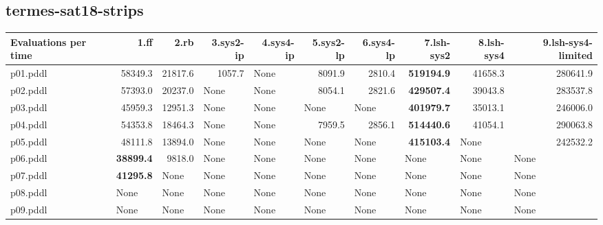 \documentclass{article}
\begin{document}
\hypertarget{evaluations_per_time-termes-sat18-strips}{}
\subsection*{termes-sat18-strips}

\begin{tabular}{@{}lrrrrrrrrr@{}}
Evaluations per time & 1.ff & 2.rb & 3.sys2-ip & 4.sys4-ip & 5.sys2-lp & 6.sys4-lp & 7.lsh-sys2 & 8.lsh-sys4 & 9.lsh-sys4-limited \\
\midrule
p01.pddl & 58349.3 & 21817.6 & 1057.7 & \multicolumn{1}{|l|}{None} & 8091.9 & 2810.4 & \textbf{519194.9} & 41658.3 & 280641.9 \\
p02.pddl & 57393.0 & 20237.0 & \multicolumn{1}{|l|}{None} & \multicolumn{1}{|l|}{None} & 8054.1 & 2821.6 & \textbf{429507.4} & 39043.8 & 283537.8 \\
p03.pddl & 45959.3 & 12951.3 & \multicolumn{1}{|l|}{None} & \multicolumn{1}{|l|}{None} & \multicolumn{1}{|l|}{None} & \multicolumn{1}{|l|}{None} & \textbf{401979.7} & 35013.1 & 246006.0 \\
p04.pddl & 54353.8 & 18464.3 & \multicolumn{1}{|l|}{None} & \multicolumn{1}{|l|}{None} & 7959.5 & 2856.1 & \textbf{514440.6} & 41054.1 & 290063.8 \\
p05.pddl & 48111.8 & 13894.0 & \multicolumn{1}{|l|}{None} & \multicolumn{1}{|l|}{None} & \multicolumn{1}{|l|}{None} & \multicolumn{1}{|l|}{None} & \textbf{415103.4} & \multicolumn{1}{|l|}{None} & 242532.2 \\
p06.pddl & \textbf{38899.4} & 9818.0 & \multicolumn{1}{|l|}{None} & \multicolumn{1}{|l|}{None} & \multicolumn{1}{|l|}{None} & \multicolumn{1}{|l|}{None} & \multicolumn{1}{|l|}{None} & \multicolumn{1}{|l|}{None} & \multicolumn{1}{|l|}{None} \\
p07.pddl & \textbf{41295.8} & \multicolumn{1}{|l|}{None} & \multicolumn{1}{|l|}{None} & \multicolumn{1}{|l|}{None} & \multicolumn{1}{|l|}{None} & \multicolumn{1}{|l|}{None} & \multicolumn{1}{|l|}{None} & \multicolumn{1}{|l|}{None} & \multicolumn{1}{|l|}{None} \\
p08.pddl & \multicolumn{1}{|l|}{None} & \multicolumn{1}{|l|}{None} & \multicolumn{1}{|l|}{None} & \multicolumn{1}{|l|}{None} & \multicolumn{1}{|l|}{None} & \multicolumn{1}{|l|}{None} & \multicolumn{1}{|l|}{None} & \multicolumn{1}{|l|}{None} & \multicolumn{1}{|l|}{None} \\
p09.pddl & \multicolumn{1}{|l|}{None} & \multicolumn{1}{|l|}{None} & \multicolumn{1}{|l|}{None} & \multicolumn{1}{|l|}{None} & \multicolumn{1}{|l|}{None} & \multicolumn{1}{|l|}{None} & \multicolumn{1}{|l|}{None} & \multicolumn{1}{|l|}{None} & \multicolumn{1}{|l|}{None} \\

\end{tabular}
\end{document}
